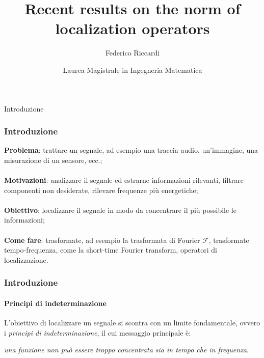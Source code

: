 \documentclass[aspectratio=141]{beamer}
\title[Recent results on the norm of localization operators]{Recent results on the norm of localization operators}
\date[ISPN ’80]{Laurea Magistrale in Ingegneria Matematica}
\author[F. Riccardi]{Federico Riccardi}
\newcommand{\F}{\mathscr{F}} %
\newcommand{\emptyline}{\phantom{ }\\}
\begin{document}
	


\begin{frame}
\titlepage
\end{frame}


\begin{section}{Introduzione}
	
	\begin{frame}
		\frametitle{Introduzione}
		\textbf{Problema}: trattare un segnale, ad esempio una traccia audio, un'immagine, una misurazione di un sensore, ecc.;\\
		\pause
		\emptyline
		\textbf{Motivazioni}: analizzare il segnale ed estrarne informazioni rilevanti, filtrare componenti non desiderate, rilevare frequenze più energetiche;\\
		\pause
		\emptyline
		\textbf{Obiettivo}: localizzare il segnale in modo da concentrare il più possibile le informazioni;\\
		\pause
		\emptyline
		\textbf{Come fare}: trasformate, ad esempio la trasformata di Fourier $\F$, trasformate tempo-frequenza, come la short-time Fourier transform, operatori di localizzazione.
	\end{frame}

	\begin{frame}
		\frametitle{Introduzione}
		\framesubtitle{Principi di indeterminazione}
		L'obiettivo di localizzare un segnale si scontra con un limite fondamentale, ovvero i \emph{principi di indeterminazione}, il cui messaggio principale è:
		\begin{center}
			\emph{una funzione non può essere troppo concentrata sia in tempo che in frequenza}.
		\end{center}
		\begin{center}
			\begin{figure}
\end{figure}
\end{center}
\end{frame}
\end{section}
\end{document}
